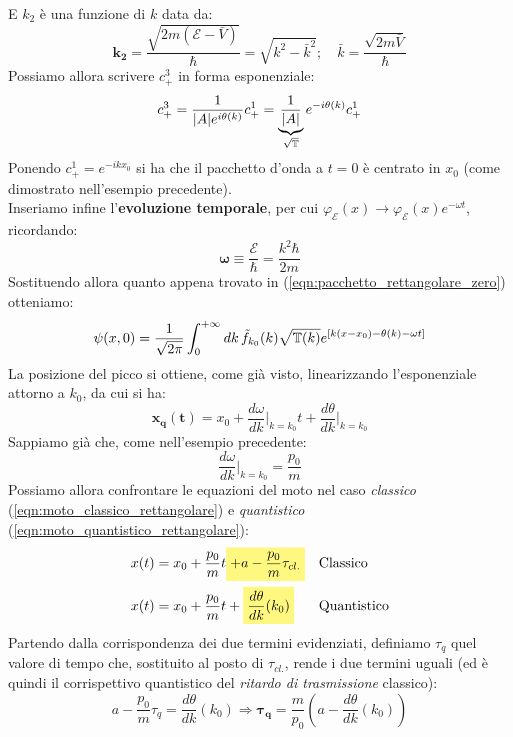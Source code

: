 \documentclass[../../FisicaTeorica.tex]{subfiles}
\begin{document}
E $k_2$ è una funzione di $k$ data da:
\begin{equation}
\bm{k_2} = \frac{\sqrt{2m(\mathcal{E}-\bar{V})}}{\hbar}=\sqrt{k^2-\bar{k}^2}; \quad \bar{k}=\frac{\sqrt{2m\bar{V}}}{\hbar}
\label{eqn:k2function}
\end{equation}
Possiamo allora scrivere $c^3_+$ in forma esponenziale:
\[
c^3_+ = \frac{1}{|A|e^{i\theta(k)}}c^1_+=\underbrace{\frac{1}{|A|}}_{\sqrt{\mathbb{T}}}e^{-i\theta(k)}c^1_+
\]
Ponendo $c^1_+ = e^{-ikx_0}$ si ha che il pacchetto d'onda a $t=0$ è centrato in $x_0$ (come dimostrato nell'esempio precedente).\\ %
Inseriamo infine l'\textbf{evoluzione temporale}, per cui $\varphi_\mathcal{E}(x)\to \varphi_\mathcal{E}(x) e^{-\omega t}$, ricordando:
\[
\bm{\omega} \equiv \frac{\mathcal{E}}{\hbar}=\frac{k^2 \hbar}{2m}
\]
Sostituendo allora quanto appena trovato in (\ref{eqn:pacchetto_rettangolare_zero}) otteniamo:
\[
\psi(x,0)=\frac{1}{\sqrt{2\pi}}\int_0^{+\infty} dk\,\tilde{f}_{k_0}(k) \sqrt{\mathbb{T}(k)} e^{[k(x-x_0)-\theta(k)-\omega t]}
\]
La posizione del picco si ottiene, come già visto, linearizzando l'esponenziale attorno a $k_0$, da cui si ha:
\begin{equation}
\bm{x_q(t)} = x_0+ \frac{d\omega}{dk}\Big|_{k=k_0} t + {\frac{d\theta}{dk}\Big|_{k=k_0}}
\label{eqn:moto_quantistico_rettangolare}
\end{equation}
Sappiamo già che, come nell'esempio precedente:
\[
\frac{d\omega}{dk}\Big|_{k=k_0}=\frac{p_0}{m}
\]
Possiamo allora confrontare le equazioni del moto nel caso \textit{classico} (\ref{eqn:moto_classico_rettangolare}) e \textit{quantistico} (\ref{eqn:moto_quantistico_rettangolare}):
\begin{align*}
x(t)&= x_0 + \frac{p_0}{m}t \hlc{Yellow}{+ a - \frac{p_0}{m}\tau_{cl.}} &&\text{Classico}\\
x(t)&=x_0+\frac{p_0}{m}t+\hlc{Yellow}{\frac{d\theta}{dk}(k_0)} && \text{Quantistico}
\end{align*}
Partendo dalla corrispondenza dei due termini evidenziati, definiamo $\tau_q$ quel valore di tempo che, sostituito al posto di $\tau_{cl.}$, rende i due termini uguali (ed è quindi il corrispettivo quantistico del \textit{ritardo di trasmissione} classico):
\begin{equation}
a-\frac{p_0}{m}\tau_q =\frac{d\theta}{dk}(k_0) \Rightarrow
\bm{\tau_q}=\frac{m}{p_0}\left(a-\frac{d\theta}{dk}(k_0)\right)
\label{eqn:ritardo_trasmissione_quantistico}
\end{equation}
\end{document}
